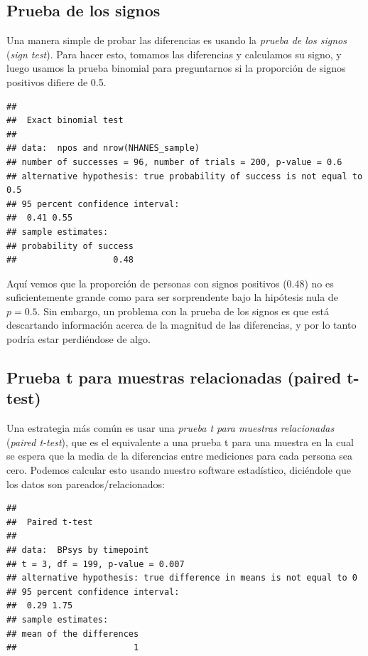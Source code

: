 \documentclass[
  12pt,
]{book}
\begin{document}
\hypertarget{prueba-de-los-signos}{%
\subsection{Prueba de los signos}\label{prueba-de-los-signos}}

Una manera simple de probar las diferencias es usando la \emph{prueba de los signos} (\emph{sign test}). Para hacer esto, tomamos las diferencias y calculamos su signo, y luego usamos la prueba binomial para preguntarnos si la proporción de signos positivos difiere de 0.5.

\begin{verbatim}
## 
##  Exact binomial test
## 
## data:  npos and nrow(NHANES_sample)
## number of successes = 96, number of trials = 200, p-value = 0.6
## alternative hypothesis: true probability of success is not equal to 0.5
## 95 percent confidence interval:
##  0.41 0.55
## sample estimates:
## probability of success 
##                   0.48
\end{verbatim}

Aquí vemos que la proporción de personas con signos positivos (0.48) no es suficientemente grande como para ser sorprendente bajo la hipótesis nula de \(p=0.5\). Sin embargo, un problema con la prueba de los signos es que está descartando información acerca de la magnitud de las diferencias, y por lo tanto podría estar perdiéndose de algo.

\hypertarget{prueba-t-para-muestras-relacionadas-paired-t-test}{%
\subsection{Prueba t para muestras relacionadas (paired t-test)}\label{prueba-t-para-muestras-relacionadas-paired-t-test}}

Una estrategia más común es usar una \emph{prueba t para muestras relacionadas} (\emph{paired t-test}), que es el equivalente a una prueba t para una muestra en la cual se espera que la media de la diferencias entre mediciones para cada persona sea cero. Podemos calcular esto usando nuestro software estadístico, diciéndole que los datos son pareados/relacionados:

\begin{verbatim}
## 
##  Paired t-test
## 
## data:  BPsys by timepoint
## t = 3, df = 199, p-value = 0.007
## alternative hypothesis: true difference in means is not equal to 0
## 95 percent confidence interval:
##  0.29 1.75
## sample estimates:
## mean of the differences 
##                       1
\end{verbatim}
\end{document}

